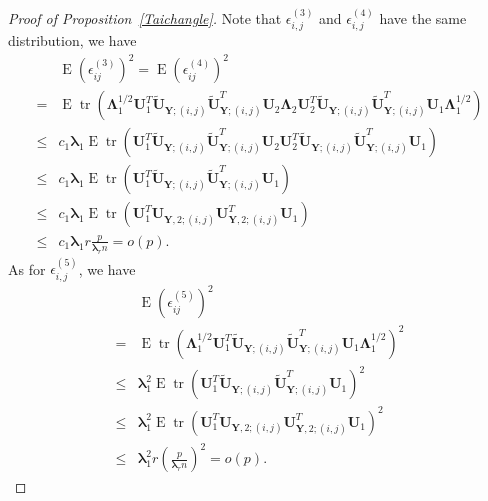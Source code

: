 \documentclass[12pt]{article} %
\DeclareMathOperator{\mytr}{tr}
\DeclareMathOperator{\myE}{E}
\newcommand{\bY}{\mathbf{Y}}
\newcommand{\bU}{\mathbf{U}}
\newcommand{\bfsym}[1]{\ensuremath{\boldsymbol{#1}}}
\def\blambda {\bfsym {\lambda}}
\def\bLambda {\bfsym {\Lambda}}
\theoremstyle{definition}
\begin{document}
\begin{appendices}
\begin{proof}[Proof of Proposition~\ref{Taichangle}]
        Note that $\epsilon_{i,j}^{(3)}$ and $\epsilon_{i,j}^{(4)}$ have the same distribution, we have
        $$
        \begin{aligned}
            &\myE(\epsilon_{ij}^{(3)})^2 =
            \myE(\epsilon_{ij}^{(4)})^2 \\
            =&\myE \mytr ( \bLambda_1^{1/2}\bU_1^T\tilde{\bU}_{\bY;(i,j)}\tilde{\bU}_{\bY;(i,j)}^T \bU_2 \bLambda_2 \bU_2^T \tilde{\bU}_{\bY;(i,j)}\tilde{\bU}_{\bY;(i,j)}^T \bU_1 \bLambda_1^{1/2})\\
            \leq& c_1 \blambda_1  \myE \mytr ( \bU_1^T\tilde{\bU}_{\bY;(i,j)}\tilde{\bU}_{\bY;(i,j)}^T \bU_2 \bU_2^T \tilde{\bU}_{\bY;(i,j)}\tilde{\bU}_{\bY;(i,j)}^T \bU_1 )\\
            \leq& c_1 \blambda_1  \myE \mytr ( \bU_1^T\tilde{\bU}_{\bY;(i,j)}\tilde{\bU}_{\bY;(i,j)}^T \bU_1 )\\
            \leq& c_1 \blambda_1  \myE \mytr ( \bU_1^T{\bU}_{\bY,2;(i,j)}{\bU}_{\bY,2;(i,j)}^T \bU_1 )\\
            \leq& c_1 \blambda_1 r \frac{p}{\blambda_r n}=o(p).
        \end{aligned}
        $$
        As for $\epsilon_{i,j}^{(5)}$, we have
        $$
        \begin{aligned}
            &\myE(\epsilon_{ij}^{(5)})^2 \\
            =&\myE \mytr (\bLambda_1^{1/2}\bU_1^T
            \tilde{\bU}_{\bY;(i,j)} \tilde{\bU}_{\bY;(i,j)}^T\bU_1 \bLambda_1^{1/2})^2\\
            \leq & \blambda_1^2\myE \mytr (\bU_1^T
            \tilde{\bU}_{\bY;(i,j)} \tilde{\bU}_{\bY;(i,j)}^T\bU_1 )^2\\
            \leq&  \blambda_1^2  \myE \mytr ( \bU_1^T{\bU}_{\bY,2;(i,j)}{\bU}_{\bY,2;(i,j)}^T \bU_1 )^2\\
            \leq& \blambda_1^2 r (\frac{p}{\blambda_r n})^2=o(p).
        \end{aligned}
        $$


\end{proof}
\end{appendices}
\end{document}
